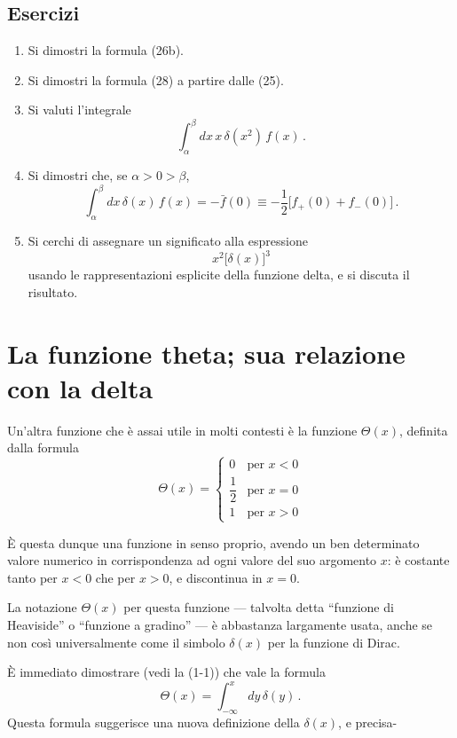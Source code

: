\documentclass[11pt, a4paper]{book}
\numberwithin{equation}{section}
\newenvironment{esercizi}{\subsection*{Esercizi}\begin{enumerate}}{\end{enumerate}}
\begin{document}
\begin{esercizi}
\begin{align*}
\int_{-\infty}^{+\infty} dx\, \delta[\sin x]\, e^{-|yx|} &= \coth(\pi|y|/2) \,, \\
\int_{-\infty}^{+\infty} dx\, \delta[\cos x]\, e^{-|yx|} &= 1/\sinh(\pi|y|/2) \,.  %
\end{align*}
\item Si dimostri la formula (26b).
\item Si dimostri la formula (28) a partire dalle (25).
\item Si valuti l'integrale
\[
\int_{\alpha}^{\beta} dx\, x\, \delta(x^2)\, f(x) \,.
\]
\item Si dimostri che, se $\alpha > 0 > \beta$,
\[
\int_{\alpha}^{\beta} dx\, \delta(x)\, f(x) = -\bar{f}(0) \equiv -\frac{1}{2}\bigl[f_+(0) + f_-(0)\bigr] \,.
\]
\item Si cerchi di assegnare un significato alla espressione
\[
x^2\bigl[\delta(x)\bigr]^3
\]
usando le rappresentazioni esplicite della funzione delta, e si discuta il risultato.
\end{esercizi}

\section{La funzione theta; sua relazione con la delta}

Un'altra funzione che è assai utile in molti contesti è la funzione $\Theta(x)$, definita dalla formula
\begin{equation}
\Theta(x) =
\begin{cases}
0 & \text{per } x < 0 \\
\dfrac{1}{2} & \text{per } x = 0 \\
1 & \text{per } x > 0
\end{cases}
\tag{1}
\end{equation}

È questa dunque una funzione in senso proprio, avendo un ben determinato valore numerico in corrispondenza ad ogni valore del suo argomento $x$: è costante tanto per $x < 0$ che per $x > 0$, e discontinua in $x = 0$.

La notazione $\Theta(x)$ per questa funzione --- talvolta detta ``funzione di Heaviside'' o ``funzione a gradino'' --- è abbastanza largamente usata, anche se non così universalmente come il simbolo $\delta(x)$ per la funzione di Dirac.

È immediato dimostrare (vedi la (1-1)) che vale la formula
\begin{equation}
\Theta(x) = \int_{-\infty}^{x} dy\, \delta(y) \,. \tag{2}
\end{equation}
Questa formula suggerisce una nuova definizione della $\delta(x)$, e precisa-%
\end{document}
